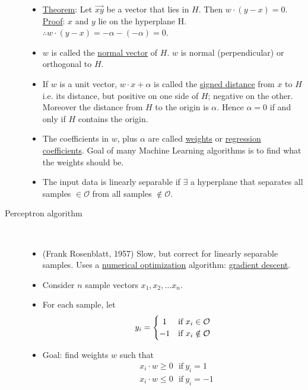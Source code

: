 \documentclass[10pt]{article}
\begin{document}
\begin{description}
\begin{itemize}
			\item \underline{Theorem}: Let $\vec{xy}$ be a vector that lies in $H$. Then $w \cdot (y - x) = 0$. \\
				\underline{Proof}: $x$ and $y$ lie on the hyperplane H. $\therefore w \cdot (y - x) = -\alpha - (-\alpha) = 0$.
				
			\item $w$ is called the \underline{normal vector} of $H$. $w$ is normal (perpendicular) or orthogonal to $H$.

			\item If $w$ is a unit vector, $w \cdot x + \alpha$ is called the \underline{signed distance} from $x$ to $H$ i.e. its distance, but positive on one side of $H$; negative on the other. Moreover the distance from $H$ to the origin is $\alpha$. Hence $\alpha = 0$ if and only if $H$ contains the origin.
			
			\item The coefficients in $w$, plus $\alpha$ are called \underline{weights} or \underline{regression coefficients}. Goal of many Machine Learning algorithms is to find what the weights should be.
			
			\item The input data is linearly separable if $\exists$ a hyperplane that separates all samples $\in \mathcal{O}$ from all samples $\notin \mathcal{O}$.
			\end{itemize}

	\item[Perceptron algorithm]
		\
		\begin{itemize}
			\item (Frank Rosenblatt, 1957) Slow, but correct for linearly separable samples. Uses a \underline{numerical optimization} algorithm: \underline{gradient descent}.
			
			\item Consider $n$ sample vectors $x_{1}, x_{2}, \dots x_{n}$.
			
			\item For each sample, let
				\[
 					y_{i} = \left\{\def\arraystretch{1.2}%
 						\begin{array}{@{}c@{\quad}l@{}}
    						1 & \text{if $x_{i} \in \mathcal{O}$}\\
    						-1 & \text{if $x_{i} \notin \mathcal{O}$}\\
  						\end{array}\right.
				\]
			
			\item Goal: find weights $w$ such that
				\begin{align*}
					& x_{i} \cdot w \geq 0 \ \ \ \text{if} \ y_{i} = 1 \\
					& x_{i} \cdot w \leq 0 \ \ \ \text{if} \ y_{i} = -1\\
				\end{align*}
			 

\end{itemize}
\end{description}
\end{document}
